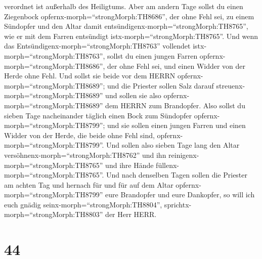 verordnet ist außerhalb des Heiligtums.  Aber am andern
Tage sollst du einen Ziegenbock opfernx-morph=``strongMorph:TH8686'',
der ohne Fehl sei, zu einem Sündopfer und den Altar damit
entsündigenx-morph=``strongMorph:TH8765'', wie er mit dem Farren
entsündigt istx-morph=``strongMorph:TH8765''.  Und wenn das
Entsündigenx-morph=``strongMorph:TH8763'' vollendet
istx-morph=``strongMorph:TH8763'', sollst du einen jungen Farren
opfernx-morph=``strongMorph:TH8686'', der ohne Fehl sei, und einen
Widder von der Herde ohne Fehl.  Und sollst sie beide vor
dem HERRN opfernx-morph=``strongMorph:TH8689''; und die Priester sollen
Salz darauf streuenx-morph=``strongMorph:TH8689'' und sollen sie also
opfernx-morph=``strongMorph:TH8689'' dem HERRN zum Brandopfer.
 Also sollst du sieben Tage nacheinander täglich einen Bock
zum Sündopfer opfernx-morph=``strongMorph:TH8799''; und sie sollen einen
jungen Farren und einen Widder von der Herde, die beide ohne Fehl sind,
opfernx-morph=``strongMorph:TH8799''.  Und sollen also
sieben Tage lang den Altar versöhnenx-morph=``strongMorph:TH8762'' und
ihn reinigenx-morph=``strongMorph:TH8765'' und ihre Hände
füllenx-morph=``strongMorph:TH8765''.  Und nach denselben
Tagen sollen die Priester am achten Tag und hernach für und für auf dem
Altar opfernx-morph=``strongMorph:TH8799'' eure Brandopfer und eure
Dankopfer, so will ich euch gnädig seinx-morph=``strongMorph:TH8804'',
sprichtx-morph=``strongMorph:TH8803'' der Herr HERR.

\hypertarget{section-43}{%
\section{44}\label{section-43}}

